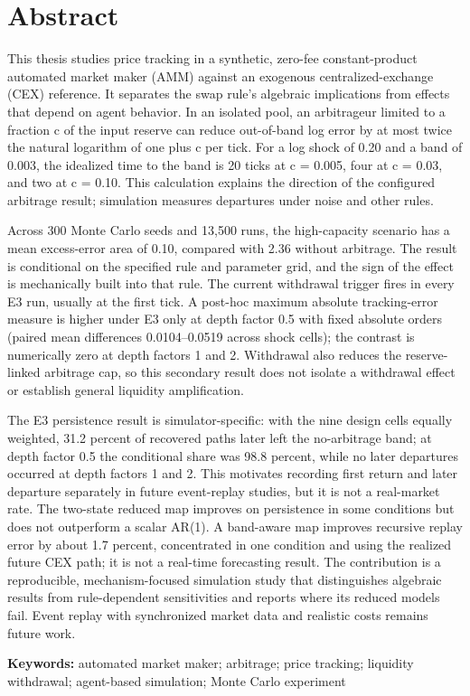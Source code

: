 \section{Abstract}

This thesis studies price tracking in a synthetic, zero-fee constant-product automated market maker (AMM) against an exogenous centralized-exchange (CEX) reference. It separates the swap rule's algebraic implications from effects that depend on agent behavior. In an isolated pool, an arbitrageur limited to a fraction c of the input reserve can reduce out-of-band log error by at most twice the natural logarithm of one plus c per tick. For a log shock of 0.20 and a band of 0.003, the idealized time to the band is 20 ticks at c = 0.005, four at c = 0.03, and two at c = 0.10. This calculation explains the direction of the configured arbitrage result; simulation measures departures under noise and other rules.

Across 300 Monte Carlo seeds and 13,500 runs, the high-capacity scenario has a mean excess-error area of 0.10, compared with 2.36 without arbitrage. The result is conditional on the specified rule and parameter grid, and the sign of the effect is mechanically built into that rule. The current withdrawal trigger fires in every E3 run, usually at the first tick. A post-hoc maximum absolute tracking-error measure is higher under E3 only at depth factor 0.5 with fixed absolute orders (paired mean differences 0.0104--0.0519 across shock cells); the contrast is numerically zero at depth factors 1 and 2. Withdrawal also reduces the reserve-linked arbitrage cap, so this secondary result does not isolate a withdrawal effect or establish general liquidity amplification.

The E3 persistence result is simulator-specific: with the nine design cells equally weighted, 31.2 percent of recovered paths later left the no-arbitrage band; at depth factor 0.5 the conditional share was 98.8 percent, while no later departures occurred at depth factors 1 and 2. This motivates recording first return and later departure separately in future event-replay studies, but it is not a real-market rate. The two-state reduced map improves on persistence in some conditions but does not outperform a scalar AR(1). A band-aware map improves recursive replay error by about 1.7 percent, concentrated in one condition and using the realized future CEX path; it is not a real-time forecasting result. The contribution is a reproducible, mechanism-focused simulation study that distinguishes algebraic results from rule-dependent sensitivities and reports where its reduced models fail. Event replay with synchronized market data and realistic costs remains future work.

\textbf{Keywords:} automated market maker; arbitrage; price tracking; liquidity withdrawal; agent-based simulation; Monte Carlo experiment
